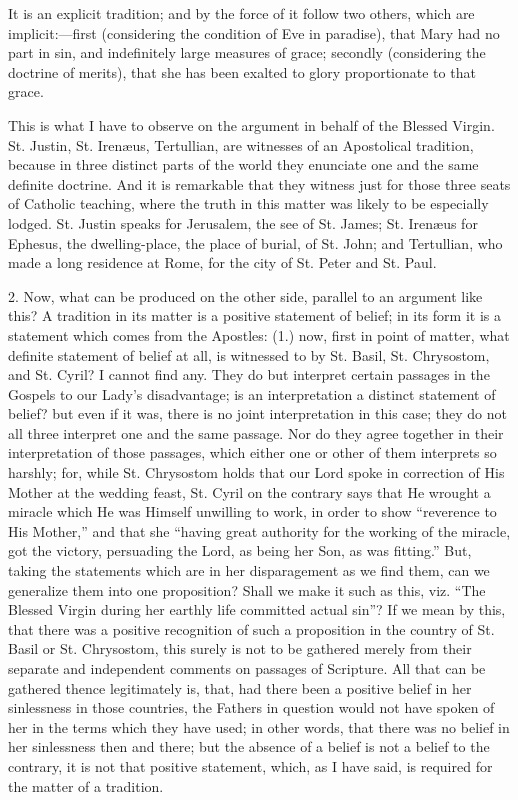 It is an explicit tradition; and by the force of it follow two
others, which are implicit:—first (considering the condition of Eve in
paradise), that Mary had no part in sin, and indefinitely large measures
of grace; secondly (considering the doctrine of merits), that she has
been exalted to glory proportionate to that grace.


This is what I have to observe on the argument in behalf of the
Blessed Virgin. St. Justin, St. Irenæus, Tertullian, are witnesses of
an Apostolical tradition, because in three distinct parts of the
world they enunciate one and the same definite doctrine. And it is
remarkable that they witness just for those three seats of Catholic
teaching, where the truth in this matter was likely to be especially
lodged. St. Justin speaks for Jerusalem, the see of St. James; St.
Irenæus for Ephesus, the dwelling-place, the place of burial, of St.
John; and Tertullian, who made a long residence at Rome, for the city of
St. Peter and St. Paul.


2. Now, what can be produced on the other side, parallel to an
argument like this? A tradition in its matter is a positive statement of
belief; in its form it is a statement which comes from the Apostles:
(1.) now, first in point of matter, what definite statement of belief at
all, is witnessed to by St. Basil, St. Chrysostom, and St. Cyril? I
cannot find any. They do but interpret certain passages in the Gospels
to our Lady's disadvantage; is an interpretation a distinct statement of
belief? but even if it was, there is no joint interpretation in this
case; they do not all three interpret one and the same passage. Nor do
they agree together in their interpretation of those passages, which
either one or other of them interprets so harshly; for, while St.
Chrysostom holds that our Lord spoke in correction of His Mother at the
wedding feast, St. Cyril on the contrary says that He wrought a miracle
which He was Himself unwilling to work, in order to show ``reverence
to His Mother,'' and that she ``having great authority for the
working of the miracle, got the victory, persuading the Lord, as being
her Son, as was fitting.'' But, taking the statements which are in
her disparagement as we find them, can we generalize them into one
proposition? Shall we make it such as this, viz. ``The Blessed
Virgin during her earthly life committed actual sin''? If we mean by
this, that there was a positive recognition of such a proposition in the
country of St. Basil or St. Chrysostom, this surely is not to be
gathered merely from their separate and independent comments on passages
of Scripture. All that can be gathered thence legitimately is, that, had
there been a positive belief in her sinlessness in those countries, the
Fathers in question would not have spoken of her in the terms which they
have used; in other words, that there was no belief in her sinlessness
then and there; but the absence of a belief is not a belief to the
contrary, it is not that positive statement, which, as I have said, is
required for the matter of a tradition.


